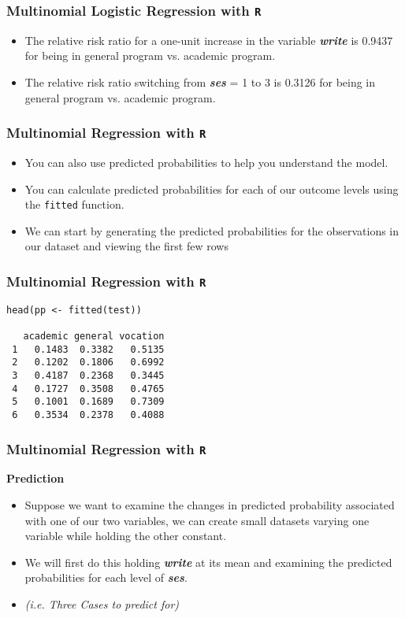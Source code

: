 \documentclass[00-GLMregslides.tex]{subfiles}
\begin{document}
\begin{frame}[fragile]
\frametitle{Multinomial Logistic Regression with \texttt{R}}
\Large
\begin{itemize}
\item The relative risk ratio for a one-unit increase in the variable \textbf{\textit{write}} is 0.9437 for being in general program vs. academic program. 
\item The relative risk ratio switching from \textbf{\textit{ses}} = 1 to 3 is 0.3126 for being in general program vs. academic program. 
\end{itemize}
\end{frame}
\begin{frame}[fragile]

\frametitle{Multinomial Regression with \texttt{R}}
\Large
\begin{itemize}
\item You can also use predicted probabilities to help you understand the model. 
\item You can calculate predicted probabilities for each of our outcome levels using the \texttt{fitted} function. 
\item We can start by generating the predicted probabilities for the observations in our dataset and viewing the first few rows
\end{itemize}
\end{frame}
\begin{frame}[fragile]

\frametitle{Multinomial Regression with \texttt{R}}
\Large
\begin{verbatim}
head(pp <- fitted(test))
 
   academic general vocation
 1   0.1483  0.3382   0.5135
 2   0.1202  0.1806   0.6992
 3   0.4187  0.2368   0.3445
 4   0.1727  0.3508   0.4765
 5   0.1001  0.1689   0.7309
 6   0.3534  0.2378   0.4088
\end{verbatim} 
\end{frame}
\begin{frame}[fragile]
	
	\frametitle{Multinomial Regression with \texttt{R}}
	\Large
\textbf{Prediction}
\begin{itemize}
\item Suppose we want to examine the changes in predicted probability associated with one of our two variables, we can create small datasets varying one 
variable while holding the other constant. 
\item We will first do this holding \textbf{\textit{write}} at its mean and examining the predicted probabilities for each level of \textbf{\textit{ses}}.
\item \textit{(i.e. Three Cases to predict for) }
\end{itemize}

 
\end{frame}
\end{document}
